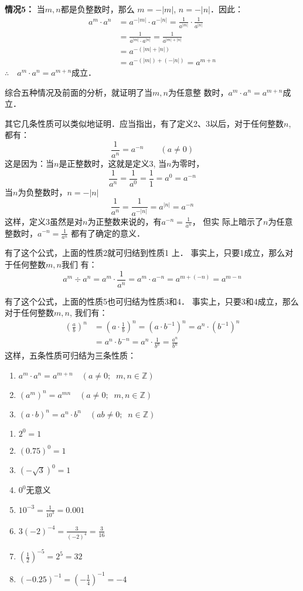 \textbf{情况5：} 当$m,n$都是负整数时，那么
$m=-|m|$, $n=-|n|$．因此：
\[\begin{split}
    a^m\cdot a^n&=a^{-|m|}\cdot a^{-|n|}=\frac{1}{a^{|m|}}\cdot \frac{1}{a^{|n|}}\\
    &=\frac{1}{a^{|m|}\cdot a^{|n|}}=\frac{1}{a^{|m|+|n|}}\\
    &=a^{-(|m|+|n|)}\\
    &=a^{-(|m|)+(-|n|)}=a^{m+n}
\end{split}\]
$\therefore\quad a^m\cdot a^n=a^{m+n}$成立．

综合五种情况及前面的分析，就证明了当$m,n$为任意整
数时，$a^m\cdot a^n=a^{m+n}$成立．

其它几条性质可以类似地证明．应当指出，有了定义2、3以后，对于任何整数$n$, 都有：
\[\frac{1}{a^n}=a^{-n}\qquad (a\ne 0)\]
这是因为：当$n$是正整数时，这就是定义3, 当$n$为零时，
 \[\frac{1}{a^n}=\frac{1}{a^0}=\frac{1}{1}=a^0=a^{-n}\]
 当$n$为负整数时，$n=-|n|$
\[\frac{1}{a^n}=\frac{1}{a^{-|n|}}=a^{|n|}=a^{-n}\]
这样，定义3虽然是对$n$为正整数来说的，有$a^{-n}=\frac{1}{a^n}$，
但实
际上暗示了$n$为任意整数时，$a^{-n}=\frac{1}{a^n}$
都有了确定的意义．

有了这个公式，上面的性质2就可归结到性质1
上．
事实上，只要1成立，那么对于任何整数$m,n$我们
有：
\[a^m\div a^n=a^m\cdot \frac{1}{a^n}=a^m\cdot a^{-n}=a^{m+(-n)}=a^{m-n}\]

有了这个公式，上面的性质5也可归结为性质3和4．
事实上，只要3和4成立，那么对于任何整数$m,n$,
我们有：
\[\begin{split}
    \left(\frac{a}{b}\right)^n&=\left(a\cdot\frac{1}{b}\right)^n=(a\cdot b^{-1})^n=a^n\cdot (b^{-1})^n\\
    &=a^n \cdot b^{-n}=a^n\cdot \frac{1}{b^n}=\frac{a^n}{b^n}
\end{split}\]
这样，五条性质可归结为三条性质：
\begin{enumerate}
    \item $a^m\cdot a^n=a^{m+n}\quad (a\ne 0;\;\;m,n\in\mathbb{Z})$
    \item $(a^m)^n=a^{mn}\quad (a\ne 0;\;\;m,n\in\mathbb{Z})$
    \item $(a\cdot b)^n=a^n\cdot b^n \quad (ab\ne 0;\;\;n\in\mathbb{Z})$
\end{enumerate}


\begin{example}
\begin{multicols}{2}  
    \begin{enumerate}
        \item $2^0=1$
        \item $(0.75)^0=1$
        \item $\left(-\sqrt{3}\right)^0=1$
        \item $0^0$无意义
        \item $10^{-3}=\frac{1}{10^3}=0.001$
        \item $3(-2)^{-4}=\frac{3}{(-2)^{4}}=\frac{3}{16}$
        \item $\left(\frac{1}{2}\right)^{-5}=2^5=32$
        \item $(-0.25)^{-1}=\left(-\frac{1}{4}\right)^{-1}=-4$
    \end{enumerate}
\end{multicols}   
\end{example}

